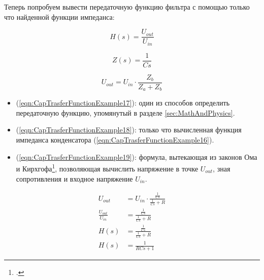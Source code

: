 \documentclass[a4paper, 10pt, final]{article} %
\begin{document}
    \noindent Теперь попробуем вывести передаточную функцию фильтра с помощью только что найденной функции импеданса:
    \begin{figure}[H]
        \centering
        \begin{minipage}[b]{.3\linewidth}
            \centering
            \begin{equation} \label{eqn:CapTrasferFunctionExample17}
                H(s) = \frac{U_{out}}{U_{in}}
            \end{equation}
        \end{minipage}
        \hspace{0.04\linewidth}
        \begin{minipage}[b]{.3\linewidth}
            \centering
            \begin{equation} \label{eqn:CapTrasferFunctionExample18}
                Z(s) = \frac{1}{C s}
            \end{equation}
        \end{minipage}
        \hspace*{0.04\linewidth}
        \begin{minipage}[b]{.3\linewidth}
            \centering
            \begin{equation} \label{eqn:CapTrasferFunctionExample19}
                U_{out} = U_{in} \cdot \frac{Z_b}{Z_a + Z_b}
            \end{equation}
        \end{minipage}
    \end{figure}
    \begin{itemize}
        \item (\ref{eqn:CapTrasferFunctionExample17}): один из способов определить передаточную функцию, упомянутый в разделе \ref{sec:MathAndPhysics}.
        \item (\ref{eqn:CapTrasferFunctionExample18}): только что вычисленная функция импеданса конденсатора (\ref{eqn:CapTrasferFunctionExample16}).
        \item (\ref{eqn:CapTrasferFunctionExample19}): формула, вытекающая из законов Ома и Кирхгофа\footcite[]{Kirchhoff:Wiki}, позволяющая вычислить напряжение в точке $U_{out}$, зная сопротивления и входное напряжение $U_{in}$.
    \end{itemize}
    \begin{align}
        U_{out} &= U_{in} \cdot \frac{\frac{1}{C s}}{\frac{1}{C s}+R} \label{eqn:CapTrasferFunctionExample20} \\
        \frac{U_{out}}{U_{in}} &= \frac{\frac{1}{C s}}{\frac{1}{C s}+R} \label{eqn:CapTrasferFunctionExample21} \\
        H(s) &= \frac{\frac{1}{C s}}{\frac{1}{C s}+R} \label{eqn:CapTrasferFunctionExample22} \\
        H(s) &= \frac{1}{R C s + 1} \label{eqn:CapTrasferFunctionExample23}
    \end{align}
\end{document}
